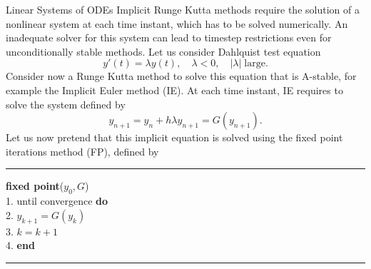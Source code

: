 \documentclass{article}
\begin{document}
\begin{section}{Linear Systems of ODEs}
Implicit Runge Kutta methods require the solution of a nonlinear system at each time instant, which has to be solved numerically. An inadequate solver for this system can lead to timestep restrictions even for unconditionally stable methods. Let us consider Dahlquist test equation
\begin{equation*}
	y'(t) = \lambda y(t), \quad \lambda < 0, \quad |\lambda| \; \mbox{large}.
\end{equation*} 
Consider now a Runge Kutta method to solve this equation that is A-stable, for example the Implicit Euler method (IE). At each time instant, IE requires to solve the system defined by
\begin{equation*}
	y_{n+1} = y_n + h\lambda y_{n+1} = G(y_{n+1}).
\end{equation*}
Let us now pretend that this implicit equation is solved using the fixed point iterations method (FP), defined by

\noindent\rule{8cm}{0.6pt}

\noindent \textbf{fixed point}($y_0,G$) \\
1. \indent until convergence \textbf{do} \\
2. \indent \indent $y_{k+1} = G(y_k)$ \\
3. \indent \indent $k = k + 1$ \\ 
4. \indent \textbf{end}

\noindent\rule{8cm}{0.6pt}


\end{section}
\end{document}
